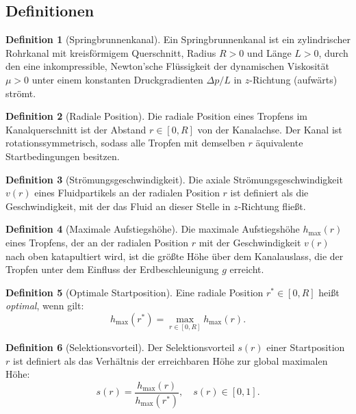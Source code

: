 ﻿\documentclass[a4paper,12pt]{article}
\theoremstyle{definition}
\newtheorem{definition}{Definition}
\begin{document}
\subsection{Definitionen}

\begin{definition}[Springbrunnenkanal]
    Ein Springbrunnenkanal ist ein zylindrischer Rohrkanal mit kreisförmigem Querschnitt,
    Radius $R > 0$ und Länge $L > 0$, durch den eine inkompressible, Newton'sche Flüssigkeit
    der dynamischen Viskosität $\mu > 0$ unter einem konstanten Druckgradienten $\Delta p / L$
    in $z$-Richtung (aufwärts) strömt.
\end{definition}

\begin{definition}[Radiale Position]
    Die radiale Position eines Tropfens im Kanalquerschnitt ist der Abstand $r \in [0, R]$
    von der Kanalachse. Der Kanal ist rotationssymmetrisch, sodass alle Tropfen mit
    demselben $r$ äquivalente Startbedingungen besitzen.
\end{definition}

\begin{definition}[Strömungsgeschwindigkeit]
    Die axiale Strömungsgeschwindigkeit $v(r)$ eines Fluidpartikels an der radialen
    Position $r$ ist definiert als die Geschwindigkeit, mit der das Fluid an dieser
    Stelle in $z$-Richtung fließt.
\end{definition}

\begin{definition}[Maximale Aufstiegshöhe]
    Die maximale Aufstiegshöhe $h_{\max}(r)$ eines Tropfens, der an der radialen Position
    $r$ mit der Geschwindigkeit $v(r)$ nach oben katapultiert wird, ist die größte Höhe
    über dem Kanalauslass, die der Tropfen unter dem Einfluss der Erdbeschleunigung $g$
    erreicht.
\end{definition}

\begin{definition}[Optimale Startposition]
    Eine radiale Position $r^* \in [0, R]$ heißt \emph{optimal}, wenn gilt:
    \[
    h_{\max}(r^*) = \max_{r \in [0, R]} h_{\max}(r).
    \]
\end{definition}

\begin{definition}[Selektionsvorteil]
    Der Selektionsvorteil $s(r)$ einer Startposition $r$ ist definiert als das Verhältnis
    der erreichbaren Höhe zur global maximalen Höhe:
    \[
    s(r) = \frac{h_{\max}(r)}{h_{\max}(r^*)}, \quad s(r) \in [0, 1].
    \]
\end{definition}
\end{document}
